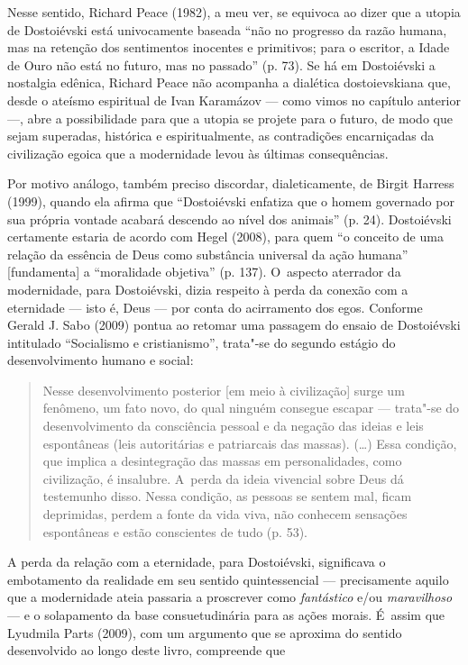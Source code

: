 Nesse sentido, Richard Peace (1982), a meu ver, se equivoca ao dizer que
a utopia de Dostoiévski está univocamente baseada ``não no progresso da
razão humana, mas na retenção dos sentimentos inocentes e primitivos;
para o escritor, a Idade de Ouro não está no futuro, mas no passado''
(p. 73). Se há em Dostoiévski a nostalgia edênica, Richard Peace não
acompanha a dialética dostoievskiana que, desde o ateísmo espiritual de
Ivan Karamázov --- como vimos no capítulo anterior ---, abre a
possibilidade para que a utopia se projete para o futuro, de modo que
sejam superadas, histórica e espiritualmente, as contradições
encarniçadas da civilização egoica que a modernidade levou às últimas
consequências.

Por motivo análogo, também preciso discordar, dialeticamente, de Birgit
Harress (1999), quando ela afirma que ``Dostoiévski enfatiza que o homem
governado por sua própria vontade acabará descendo ao nível dos
animais'' (p. 24). Dostoiévski certamente estaria de acordo com Hegel
(2008), para quem ``o conceito de uma relação da essência de Deus como
substância universal da ação humana'' {[}fundamenta{]} a ``moralidade
objetiva'' (p. 137). O~aspecto aterrador da modernidade, para
Dostoiévski, dizia respeito à perda da conexão com a eternidade --- isto
é, Deus --- por conta do acirramento dos egos. Conforme Gerald J. Sabo
(2009) pontua ao retomar uma passagem do ensaio de Dostoiévski
intitulado ``Socialismo e cristianismo'', trata"-se do segundo estágio do
desenvolvimento humano e social:

\begin{quote}
Nesse desenvolvimento posterior {[}em meio à civilização{]} surge um
fenômeno, um fato novo, do qual ninguém consegue escapar --- trata"-se do
desenvolvimento da consciência pessoal e da negação das ideias e leis
espontâneas (leis autoritárias e patriarcais das massas). (\ldots) Essa
condição, que implica a desintegração das massas em personalidades, como
civilização, é insalubre. A~perda da ideia vivencial sobre Deus dá
testemunho disso. Nessa condição, as pessoas se sentem mal, ficam
deprimidas, perdem a fonte da vida viva, não conhecem sensações
espontâneas e estão conscientes de tudo (p. 53).
\end{quote}

A perda da relação com a eternidade, para Dostoiévski, significava o
embotamento da realidade em seu sentido quintessencial --- precisamente
aquilo que a modernidade ateia passaria a proscrever como
\emph{fantástico} e/ou \emph{maravilhoso} --- e o solapamento da base
consuetudinária para as ações morais. É~assim que Lyudmila Parts (2009),
com um argumento que se aproxima do sentido desenvolvido ao longo deste
livro, compreende que

